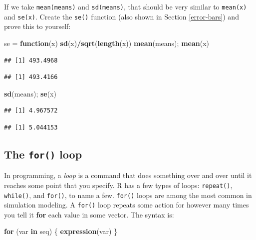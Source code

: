 \documentclass[]{book}
\newenvironment{Shaded}{\begin{snugshade}}{\end{snugshade}}
\newcommand{\ControlFlowTok}[1]{\textcolor[rgb]{0.13,0.29,0.53}{\textbf{#1}}}
\newcommand{\KeywordTok}[1]{\textcolor[rgb]{0.13,0.29,0.53}{\textbf{#1}}}
\newcommand{\NormalTok}[1]{#1}
\newcommand{\OperatorTok}[1]{\textcolor[rgb]{0.81,0.36,0.00}{\textbf{#1}}}
\newcommand{\StringTok}[1]{\textcolor[rgb]{0.31,0.60,0.02}{#1}}
\begin{document}
If we take \texttt{mean(means)} and \texttt{sd(means)}, that should be very similar to \texttt{mean(x)} and \texttt{se(x)}. Create the \texttt{se()} function (also shown in Section \ref{error-bars}) and prove this to yourself:

\begin{Shaded}
\begin{Highlighting}[]
\NormalTok{se =}\StringTok{ }\ControlFlowTok{function}\NormalTok{(x) }\KeywordTok{sd}\NormalTok{(x)}\OperatorTok{/}\KeywordTok{sqrt}\NormalTok{(}\KeywordTok{length}\NormalTok{(x))}
\KeywordTok{mean}\NormalTok{(means); }\KeywordTok{mean}\NormalTok{(x)}
\end{Highlighting}
\end{Shaded}

\begin{verbatim}
## [1] 493.4968
\end{verbatim}

\begin{verbatim}
## [1] 493.4166
\end{verbatim}

\begin{Shaded}
\begin{Highlighting}[]
\KeywordTok{sd}\NormalTok{(means); }\KeywordTok{se}\NormalTok{(x)}
\end{Highlighting}
\end{Shaded}

\begin{verbatim}
## [1] 4.967572
\end{verbatim}

\begin{verbatim}
## [1] 5.044153
\end{verbatim}

\hypertarget{for-loops}{%
\subsection{\texorpdfstring{The \texttt{for()} loop}{The for() loop}}\label{for-loops}}

In programming, a \emph{loop} is a command that does something over and over until it reaches some point that you specify. R has a few types of loops: \texttt{repeat()}, \texttt{while()}, and \texttt{for()}, to name a few. \texttt{for()} loops are among the most common in simulation modeling. A \texttt{for()} loop repeats some action for however many times you tell it \textbf{for} each value in some vector. The syntax is:

\begin{Shaded}
\begin{Highlighting}[]
\ControlFlowTok{for}\NormalTok{ (var }\ControlFlowTok{in}\NormalTok{ seq) \{}
  \KeywordTok{expression}\NormalTok{(var)}
\NormalTok{\}}
\end{Highlighting}
\end{Shaded}
\end{document}
